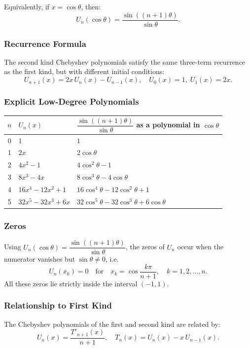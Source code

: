 \documentclass[12pt]{article}
\begin{document}
Equivalently, if $x = \cos\theta$, then:
\[ U_n(\cos\theta) = \frac{\sin((n+1)\theta)}{\sin\theta}. \]

\subsubsection{Recurrence Formula}
The second kind Chebyshev polynomials satisfy the same three-term recurrence as the first kind, but with different initial conditions:
\[ U_{n+1}(x) = 2x\,U_n(x) - U_{n-1}(x), \quad U_0(x)=1,\; U_1(x)=2x. \]

\subsubsection{Explicit Low-Degree Polynomials}
\begin{center}
\begin{tabular}{c|l|l}
  $n$ & $U_n(x)$ & $\dfrac{\sin((n+1)\theta)}{\sin\theta}$ as a polynomial in $\cos\theta$ \\ \hline
  0 & $1$ & $1$ \\
  1 & $2x$ & $2\cos\theta$ \\
  2 & $4x^2 - 1$ & $4\cos^2\theta - 1$ \\
  3 & $8x^3 - 4x$ & $8\cos^3\theta - 4\cos\theta$ \\
  4 & $16x^4 - 12x^2 + 1$ & $16\cos^4\theta - 12\cos^2\theta + 1$ \\
  5 & $32x^5 - 32x^3 + 6x$ & $32\cos^5\theta - 32\cos^3\theta + 6\cos\theta$
\end{tabular}
\end{center}

\subsubsection{Zeros}
Using $U_n(\cos\theta) = \dfrac{\sin((n+1)\theta)}{\sin\theta}$, the zeros of $U_n$ occur when the numerator vanishes but $\sin\theta \neq 0$, i.e.
\[
  U_n(x_k) = 0 \quad\text{for}\quad x_k = \cos\frac{k\pi}{n+1},\quad k = 1,2,\dots,n.
\]
All these zeros lie strictly inside the interval $(-1,1)$.

\subsubsection{Relationship to First Kind}
The Chebyshev polynomials of the first and second kind are related by:
\[ U_n(x) = \frac{T'_{n+1}(x)}{n+1}, \quad T_n(x) = U_n(x) - x\,U_{n-1}(x). \]
\end{document}
